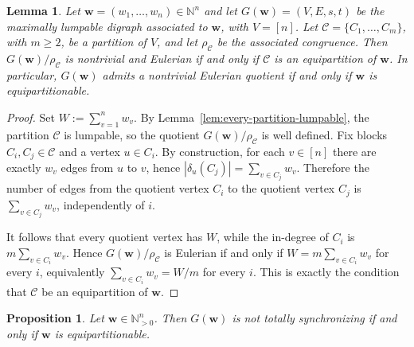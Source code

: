 \documentclass[a4paper,10pt]{amsart}
\theoremstyle{plain}
\newtheorem{lemma}[theorem]{Lemma}
\newtheorem{proposition}[theorem]{Proposition}
\theoremstyle{definition}
\begin{document}
\begin{lemma}\label{lem:eulerian-for-Gw-equivalent-to-partitionable}
Let $\mathbf w=(w_1,\dots,w_n)\in\mathbb N^n$ and let $G(\mathbf w)=(V,E,s,t)$ be the maximally lumpable digraph associated to $\mathbf w$, with $V=[n]$. Let $\mathcal C=\{C_1,\dots,C_m\}$, with $m\ge 2$, be a partition of $V$, and let $\rho_{\mathcal C}$ be the associated congruence. Then $G(\mathbf w)/\rho_{\mathcal C}$ is nontrivial and Eulerian if and only if $\mathcal C$ is an equipartition of $\mathbf w$. In particular, $G(\mathbf w)$ admits a nontrivial Eulerian quotient if and only if $\mathbf w$ is equipartitionable.
\end{lemma}
\begin{proof}
Set $W:=\sum_{v=1}^n w_v$. By Lemma~\ref{lem:every-partition-lumpable}, the partition $\mathcal C$ is lumpable, so the quotient $G(\mathbf w)/\rho_{\mathcal C}$ is well defined. Fix blocks $C_i,C_j\in\mathcal C$ and a vertex $u\in C_i$. By construction, for each $v\in[n]$ there are exactly $w_v$ edges from $u$ to $v$, hence $|\delta_u(C_j)|=\sum_{v\in C_j} w_v$. Therefore the number of edges from the quotient vertex $C_i$ to the quotient vertex $C_j$ is $\sum_{v\in C_j} w_v$, independently of $i$.

It follows that every quotient vertex has  $W$, while the in-degree of $C_i$ is $m\sum_{v\in C_i} w_v$. Hence $G(\mathbf w)/\rho_{\mathcal C}$ is Eulerian if and only if $W=m\sum_{v\in C_i} w_v$ for every $i$, equivalently $\sum_{v\in C_i} w_v=W/m$ for every $i$. This is exactly the condition that $\mathcal C$ be an equipartition of $\mathbf w$.
\end{proof}
\begin{proposition}\label{prop:not-totally-synchronizing}
Let $\mathbf w\in\mathbb N_{>0}^{n}$. Then $G(\mathbf w)$ is not totally synchronizing if and only if $\mathbf w$ is equipartitionable.
\end{proposition}
\end{document}
